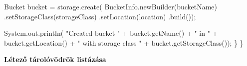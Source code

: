\documentclass[
]{article}
\newenvironment{Shaded}{}{}
\newcommand{\BuiltInTok}[1]{\textcolor[rgb]{0.00,0.50,0.00}{#1}}
\newcommand{\FunctionTok}[1]{\textcolor[rgb]{0.02,0.16,0.49}{#1}}
\newcommand{\NormalTok}[1]{#1}
\newcommand{\OperatorTok}[1]{\textcolor[rgb]{0.40,0.40,0.40}{#1}}
\newcommand{\StringTok}[1]{\textcolor[rgb]{0.25,0.44,0.63}{#1}}
\begin{document}
\begin{Shaded}
\begin{Highlighting}[]
\NormalTok{    Bucket bucket }\OperatorTok{=}
\NormalTok{        storage}\OperatorTok{.}\FunctionTok{create}\OperatorTok{(}
\NormalTok{            BucketInfo}\OperatorTok{.}\FunctionTok{newBuilder}\OperatorTok{(}\NormalTok{bucketName}\OperatorTok{)}
                \OperatorTok{.}\FunctionTok{setStorageClass}\OperatorTok{(}\NormalTok{storageClass}\OperatorTok{)}
                \OperatorTok{.}\FunctionTok{setLocation}\OperatorTok{(}\NormalTok{location}\OperatorTok{)}
                \OperatorTok{.}\FunctionTok{build}\OperatorTok{());}

    \BuiltInTok{System}\OperatorTok{.}\FunctionTok{out}\OperatorTok{.}\FunctionTok{println}\OperatorTok{(}
        \StringTok{"Created bucket "}
            \OperatorTok{+}\NormalTok{ bucket}\OperatorTok{.}\FunctionTok{getName}\OperatorTok{()}
            \OperatorTok{+} \StringTok{" in "}
            \OperatorTok{+}\NormalTok{ bucket}\OperatorTok{.}\FunctionTok{getLocation}\OperatorTok{()}
            \OperatorTok{+} \StringTok{" with storage class "}
            \OperatorTok{+}\NormalTok{ bucket}\OperatorTok{.}\FunctionTok{getStorageClass}\OperatorTok{());}
  \OperatorTok{\}}
\OperatorTok{\}}
\end{Highlighting}
\end{Shaded}

\textbf{Létező tárolóvödrök listázása}
\end{document}
